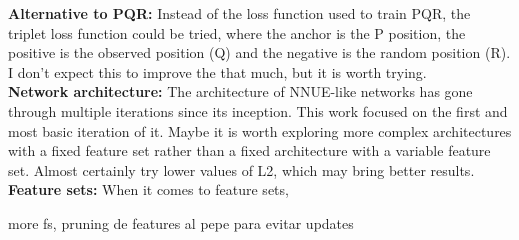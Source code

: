 \textbf{Alternative to PQR:} Instead of the loss function used to train PQR, the triplet loss function could be tried, where the anchor is the P position, the positive is the observed position (Q) and the negative is the random position (R). I don't expect this to improve the that much, but it is worth trying. \\

\textbf{Network architecture:} The architecture of NNUE-like networks has gone through multiple iterations since its inception. This work focused on the first and most basic iteration of it. Maybe it is worth exploring more complex architectures with a fixed feature set rather than a fixed architecture with a variable feature set.
Almost certainly try lower values of L2, which may bring better results. \\

\textbf{Feature sets:} When it comes to feature sets, 

more fs, pruning de features al pepe para evitar updates

